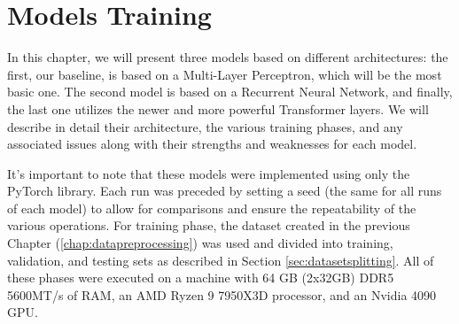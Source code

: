 \chapter{Models Training}
In this chapter, we will present three models based on
different architectures: the first, our baseline, is based on a
Multi-Layer Perceptron, which will be the most basic one.
The second model is based on a Recurrent Neural Network, and finally,
the last one utilizes the newer and more powerful Transformer layers.
We will describe in detail their architecture, the various training phases,
and any associated issues along with their strengths and weaknesses
for each model.

It's important to note that these models were implemented using only
the PyTorch library.
Each run was preceded by setting a seed (the same for all runs of each model)
to allow for comparisons and ensure the repeatability of the
various operations. For training phase, the dataset created in the
previous Chapter (\ref{chap:datapreprocessing}) was used and divided
into training, validation, and testing sets as described in Section \ref{sec:datasetsplitting}.
All of these phases were executed on a machine with 64 GB (2x32GB) DDR5 5600MT/s of RAM,
an AMD Ryzen 9 7950X3D processor, and an Nvidia 4090 GPU.

%
%


